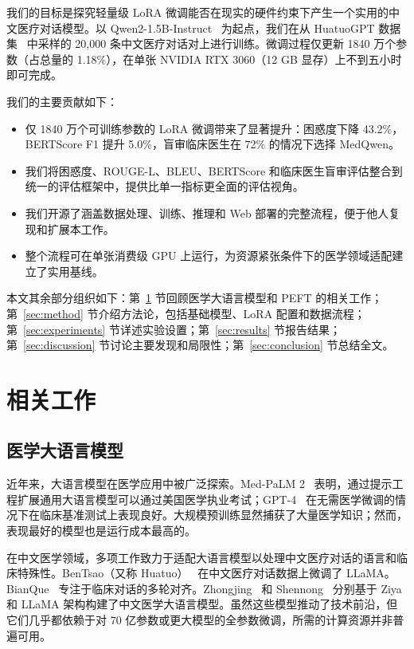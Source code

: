 \documentclass[12pt,a4paper]{article}
\begin{document}
我们的目标是探究轻量级 LoRA 微调能否在现实的硬件约束下产生一个实用的中文医疗对话模型。以 Qwen2-1.5B-Instruct~\cite{yang2024qwen2} 为起点，我们在从 HuatuoGPT 数据集~\cite{zhang2023huatuogpt} 中采样的 20,000 条中文医疗对话对上进行训练。微调过程仅更新 1840 万个参数（占总量的 1.18\%），在单张 NVIDIA RTX 3060（12 GB 显存）上不到五小时即可完成。

我们的主要贡献如下：

\begin{itemize}
    \item 仅 1840 万个可训练参数的 LoRA 微调带来了显著提升：困惑度下降 43.2\%，BERTScore F1 提升 5.0\%，盲审临床医生在 72\% 的情况下选择 MedQwen。
    \item 我们将困惑度、ROUGE-L、BLEU、BERTScore 和临床医生盲审评估整合到统一的评估框架中，提供比单一指标更全面的评估视角。
    \item 我们开源了涵盖数据处理、训练、推理和 Web 部署的完整流程，便于他人复现和扩展本工作。
    \item 整个流程可在单张消费级 GPU 上运行，为资源紧张条件下的医学领域适配建立了实用基线。
\end{itemize}

本文其余部分组织如下：第~\ref{sec:related} 节回顾医学大语言模型和 PEFT 的相关工作；第~\ref{sec:method} 节介绍方法论，包括基础模型、LoRA 配置和数据流程；第~\ref{sec:experiments} 节详述实验设置；第~\ref{sec:results} 节报告结果；第~\ref{sec:discussion} 节讨论主要发现和局限性；第~\ref{sec:conclusion} 节总结全文。

\section{相关工作}
\label{sec:related}

\subsection{医学大语言模型}

近年来，大语言模型在医学应用中被广泛探索。Med-PaLM 2~\cite{singhal2023medpalm} 表明，通过提示工程扩展通用大语言模型可以通过美国医学执业考试；GPT-4~\cite{nori2023gpt4} 在无需医学微调的情况下在临床基准测试上表现良好。大规模预训练显然捕获了大量医学知识；然而，表现最好的模型也是运行成本最高的。

在中文医学领域，多项工作致力于适配大语言模型以处理中文医疗对话的语言和临床特殊性。BenTsao（又称 Huatuo）~\cite{wang2023bentsao} 在中文医疗对话数据上微调了 LLaMA。BianQue~\cite{chen2023bianque} 专注于临床对话的多轮对齐。Zhongjing~\cite{yang2023zhongjing} 和 Shennong~\cite{shennong2023} 分别基于 Ziya 和 LLaMA 架构构建了中文医学大语言模型。虽然这些模型推动了技术前沿，但它们几乎都依赖于对 70 亿参数或更大模型的全参数微调，所需的计算资源并非普遍可用。
\end{document}
